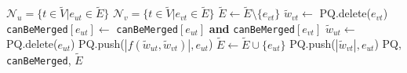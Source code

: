 \begin{algorithm}
  \hspace*{1.5cm} 
    \begin{algorithmic}[1]
      \State $\mathcal{N}_u = \{ t \in \tilde{V} | e_{ut}\in \tilde{E}  \}$
      \State $\mathcal{N}_v = \{ t \in \tilde{V} | e_{vt}\in \tilde{E}  \}$ 
       
        \State $\tilde{E} \gets \tilde{E} \setminus \{e_{vt}\}$
        \State $\tilde{w}_{vt} \gets$ PQ.delete($e_{vt}$) 
        \State \texttt{canBeMerged}$[e_{ut}] \gets$ \texttt{canBeMerged}$[e_{ut}]$ \textbf{and} \texttt{canBeMerged}$[e_{vt}]$
          \State $\tilde{w}_{ut} \gets$ PQ.delete($e_{ut}$)  
          \State PQ.push($ |f(\tilde{w}_{ut}, \tilde{w}_{vt})|, e_{ut}$) 
        \Else
          \State $\tilde{E} \gets \tilde{E} \cup \{e_{ut}\}$
          \State PQ.push($ |\tilde{w}_{vt}|, e_{ut}$) 
        \EndIf
      \EndFor
      \State
      \Return PQ, \texttt{canBeMerged}, $\tilde{E}$
    \EndFunction
  \end{algorithmic}
  \label{detailed_alg}
\end{algorithm}
